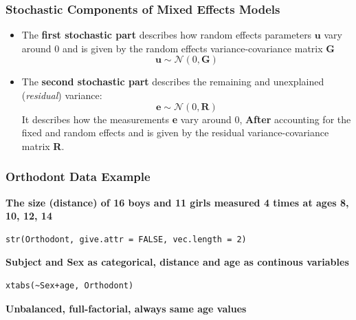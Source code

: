 \documentclass{beamer}
\begin{document}
\begin{frame}
    \frametitle{Stochastic Components of Mixed Effects Models}
    \begin{itemize}
        \item The \textbf{first stochastic part} describes how random effects parameters $\mathbf{u}$ vary around 0 and is given by the random effects variance-covariance matrix \textbf{G}
        \[
        \mathbf{u} \sim \mathcal{N}(0, \mathbf{G})
        \]
        \item The \textbf{second stochastic part} describes the remaining and unexplained (\textit{residual}) variance:
        \[
        \mathbf{e} \sim \mathcal{N}(0, \mathbf{R})
        \]
        It describes how the measurements \textbf{e} vary around 0, \textbf{After} accounting for the fixed and random effects and is given by the residual variance-covariance matrix \textbf{R}.
    \end{itemize}
\end{frame}
\begin{frame}[fragile]
    \frametitle{Orthodont Data Example}
    \textbf{The size (distance) of 16 boys and 11 girls measured 4 times at ages 8, 10, 12, 14}
    \begin{verbatim}
str(Orthodont, give.attr = FALSE, vec.length = 2)        
    \end{verbatim}
    \tiny\scalebox{0.8}{
    
    }
    \vspace{0.5cm}
    
    \normalsize\textbf{Subject and Sex as categorical, distance and age as continous variables}
    \begin{Verbatim}[frame=single]
xtabs(~Sex+age, Orthodont)
    \end{Verbatim}
    \small\scalebox{1}{
    
    }
    \vspace{0.2cm}
    
    \normalsize\textbf{Unbalanced, full-factorial, always same age values}
\end{frame}
\end{document}
